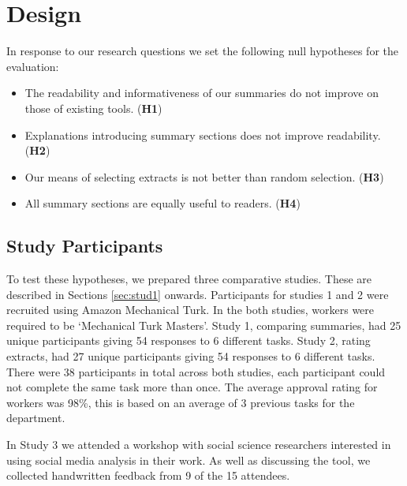   \section{Design}
    In response to our research questions we set the following null hypotheses for the evaluation:

    \begin{itemize}
      \item{The readability and informativeness of our summaries do not improve on those of existing tools. (\textbf{H1})}
      \item{Explanations introducing summary sections does not improve readability. (\textbf{H2})}
      \item{Our means of selecting extracts is not better than random selection. (\textbf{H3})}
      \item{All summary sections are equally useful to readers. (\textbf{H4})}
    \end{itemize}

    \tocless\subsection{Study Participants}
      To test these hypotheses, we prepared three comparative studies. These are described in Sections \ref{sec:stud1} onwards. Participants for studies 1 and 2 were recruited using Amazon Mechanical Turk. In the both studies, workers were required to be `Mechanical Turk Masters'. Study 1, comparing summaries, had 25 unique participants giving 54 responses to 6 different tasks. Study 2, rating extracts, had 27 unique participants giving 54 responses to 6 different tasks. There were 38 participants in total across both studies, each participant could not complete the same task more than once. The average approval rating for workers was 98\%, this is based on an average of 3 previous tasks for the department.

      In Study 3 we attended a workshop with social science researchers interested in using social media analysis in their work. As well as discussing the tool, we collected handwritten feedback from 9 of the 15 attendees.

